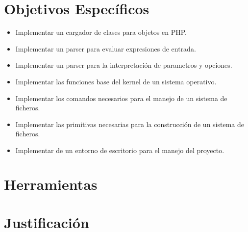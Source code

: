 \documentclass[letter,12pt]{article}
\begin{document}
\section{Objetivos Específicos}
\begin{itemize}
\item Implementar un cargador de clases para objetos en PHP.
\item Implementar un parser para evaluar expresiones de entrada.
\item Implementar un parser para la interpretación de parametros y opciones.
\item Implementar las funciones base del kernel de un sistema operativo.
\item Implementar los comandos necesarios para el manejo de un sistema de ficheros.
\item Implementar las primitivas necesarias para la construcción de un sistema de ficheros.
\item Implementar de un entorno de escritorio para el manejo del proyecto.
\end{itemize}

\section{Herramientas}

\section{Justificación}

\begin{thebibliography}{99}
\end{thebibliography}
\end{document}
